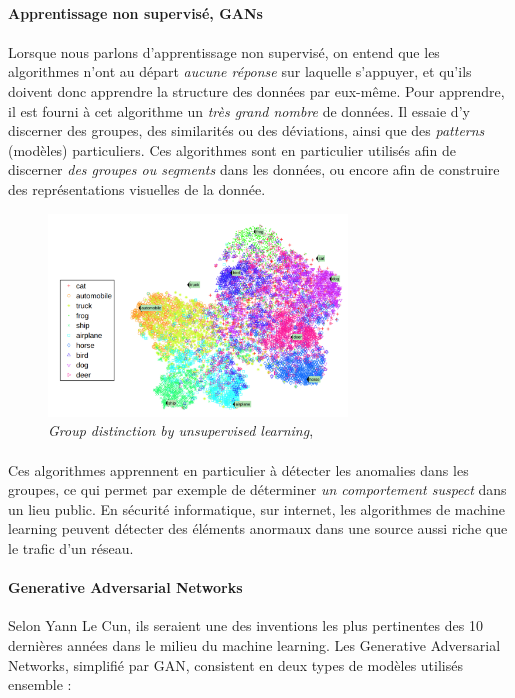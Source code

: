 \paragraph{Apprentissage non supervisé, GANs}

\paragraph{} Lorsque nous parlons d'apprentissage non supervisé, on entend que les algorithmes n'ont au départ \emph{aucune
réponse} sur laquelle s'appuyer, et qu'ils doivent donc apprendre la structure des données par eux-même. Pour apprendre, il
est fourni à cet algorithme un \emph{très grand nombre} de données. Il essaie d'y discerner des groupes, des similarités ou
des déviations, ainsi que des \emph{patterns} (modèles) particuliers. Ces algorithmes sont en particulier utilisés afin de
discerner \emph{des groupes ou segments} dans les données, ou encore afin de construire des représentations visuelles de la
donnée.

\begin{figure}[h]
    \centering
    \includegraphics[width=300px]{chapters/03/images/clustering.png}
    \caption{\label{clustering}\emph{Group distinction by unsupervised learning}, \cite{MachineLearning0}}
\end{figure}

\paragraph{} Ces algorithmes apprennent en particulier à détecter les anomalies dans les groupes, ce qui permet par 
exemple de déterminer \emph{un comportement suspect} dans un lieu public. En sécurité informatique, sur internet, 
les algorithmes de machine learning peuvent détecter des éléments anormaux dans une source aussi riche que le trafic
d'un réseau. 

\paragraph{Generative Adversarial Networks} Selon Yann Le Cun, ils seraient une des inventions les plus pertinentes
des 10 dernières années dans le milieu du machine learning. Les Generative Adversarial Networks, simplifié par GAN,
consistent en deux types de modèles utilisés ensemble :

